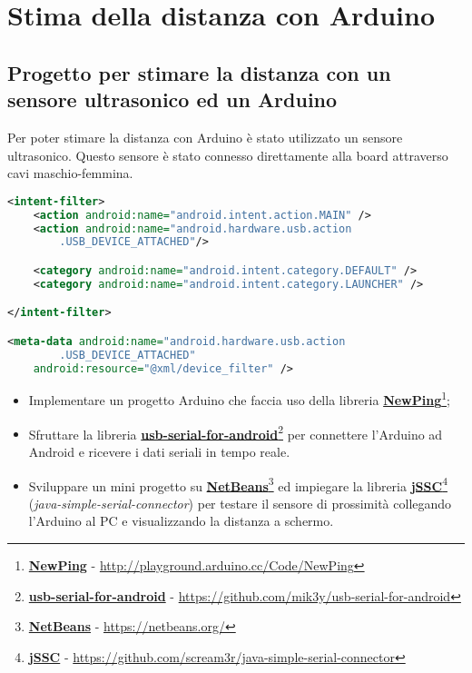 \chapter{Stima della distanza con Arduino}
\section{Progetto per stimare la distanza con un sensore ultrasonico ed un Arduino}
Per poter stimare la distanza con Arduino è stato utilizzato un sensore ultrasonico. Questo sensore è stato connesso direttamente alla board attraverso cavi maschio-femmina.

\begin{lstlisting}[language=XML]
<intent-filter>
	<action android:name="android.intent.action.MAIN" />
	<action android:name="android.hardware.usb.action
		.USB_DEVICE_ATTACHED"/>

	<category android:name="android.intent.category.DEFAULT" />
	<category android:name="android.intent.category.LAUNCHER" />

</intent-filter>

<meta-data android:name="android.hardware.usb.action
		.USB_DEVICE_ATTACHED" 
	android:resource="@xml/device_filter" />
\end{lstlisting}



\begin{itemize}
	 \item Implementare un progetto Arduino che faccia uso della libreria \href{http://playground.arduino.cc/Code/NewPing}{\textbf{NewPing}}\footnote{\href{http://playground.arduino.cc/Code/NewPing}{\textbf{NewPing}} - \url{http://playground.arduino.cc/Code/NewPing}};
	 
	 \item Sfruttare la libreria \href{https://github.com/mik3y/usb-serial-for-android}{\textbf{usb-serial-for-android}}\footnote{\href{https://github.com/mik3y/usb-serial-for-android}{\textbf{usb-serial-for-android}} - \url{https://github.com/mik3y/usb-serial-for-android}} per connettere l'Arduino ad Android e ricevere i dati seriali in tempo reale.
	 
	 \item Sviluppare un mini progetto su \href{https://netbeans.org/}{\textbf{NetBeans}}\footnote{\href{https://netbeans.org/}{\textbf{NetBeans}} - \url{https://netbeans.org/}} ed impiegare la libreria \href{https://github.com/scream3r/java-simple-serial-connector}{\textbf{jSSC}}\footnote{\href{https://github.com/scream3r/java-simple-serial-connector}{\textbf{jSSC}} - \url{https://github.com/scream3r/java-simple-serial-connector}} (\textit{java-simple-serial-connector}) per testare il sensore di prossimità collegando l'Arduino al PC e visualizzando la distanza a schermo.
\end{itemize}

